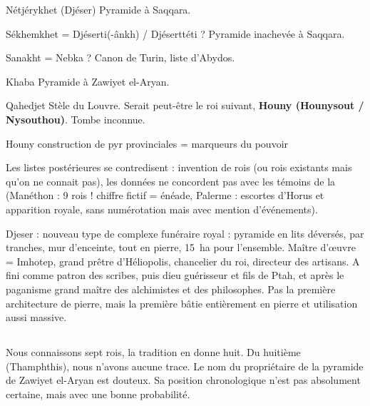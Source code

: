 \begin{listerois}
  \item [Nétjérykhet (Djéser)] Pyramide à Saqqara.
  \item [Sékhemkhet] = Djéserti(-ânkh) / Djéserttéti ? Pyramide 
        inachevée à Saqqara.
  \item [Sanakht] = Nebka ? Canon de Turin, liste d'Abydos.
  \item [Khaba] Pyramide à Zawiyet el-Aryan.
  \item [Qahedjet] Stèle du Louvre. Serait peut-être le roi suivant, 
        \textbf{\sffamily Houny (Hounysout / Nysouthou)}. 
        Tombe inconnue.
  \item [Houny] construction de pyr provinciales = marqueurs du pouvoir
\end{listerois}

Les listes postérieures se contredisent : invention de rois (ou rois 
existants mais qu'on ne connait pas), les données ne concordent pas 
avec les témoins de la  (Manéthon : 9 rois ! chiffre fictif 
= énéade, Palerme : escortes d'Horus et apparition royale, sans 
numérotation mais avec mention d'événements).

Djeser : nouveau type de complexe funéraire royal : pyramide 
en lits déversés, par tranches, mur d'enceinte, tout en pierre, 
\SI{15}{\hectare} pour l'ensemble. Maître d'{\oe}uvre = Imhotep, 
grand prêtre d'Héliopolis, chancelier du roi, directeur des artisans. 
A fini comme patron des scribes, puis dieu guérisseur et fils de Ptah, 
et après le paganisme grand maître des alchimistes et des philosophes. 
Pas la première architecture de pierre, mais la première bâtie 
entièrement en pierre et utilisation aussi massive.

\subsection{\texorpdfstring{}{IVe dynastie}}

Nous connaissons sept rois, la tradition en donne huit. Du huitième 
(Thamphthis), nous n'avons aucune trace. Le nom du propriétaire de la 
pyramide de Zawiyet el-Aryan est douteux. Sa position chronologique 
n'est pas absolument certaine, mais avec une bonne probabilité. 

\noi{} \\

